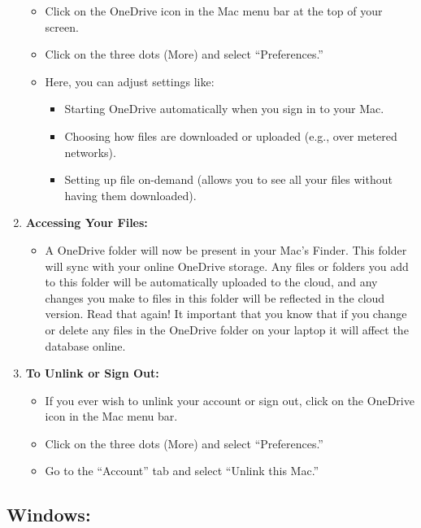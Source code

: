 \documentclass[
]{book}
\providecommand{\tightlist}{%
  \setlength{\itemsep}{0pt}\setlength{\parskip}{0pt}}
\theoremstyle{definition}
\theoremstyle{definition}
\theoremstyle{definition}
\theoremstyle{definition}
\theoremstyle{remark}
\begin{document}
\begin{enumerate}
  \begin{itemize}
  \tightlist
  \item
    Click on the OneDrive icon in the Mac menu bar at the top of your screen.
  \item
    Click on the three dots (More) and select ``Preferences.''
  \item
    Here, you can adjust settings like:

    \begin{itemize}
    \tightlist
    \item
      Starting OneDrive automatically when you sign in to your Mac.
    \item
      Choosing how files are downloaded or uploaded (e.g., over metered networks).
    \item
      Setting up file on-demand (allows you to see all your files without having them downloaded).
    \end{itemize}
  \end{itemize}
\item
  \textbf{Accessing Your Files:}

  \begin{itemize}
  \tightlist
  \item
    A OneDrive folder will now be present in your Mac's Finder. This folder will sync with your online OneDrive storage. { Any files or folders you add to this folder will be automatically uploaded to the cloud, and any changes you make to files in this folder will be reflected in the cloud version.} Read that again! It important that you know that if you change or delete any files in the OneDrive folder on your laptop it will affect the database online.
  \end{itemize}
\item
  \textbf{To Unlink or Sign Out:}

  \begin{itemize}
  \tightlist
  \item
    If you ever wish to unlink your account or sign out, click on the OneDrive icon in the Mac menu bar.
  \item
    Click on the three dots (More) and select ``Preferences.''
  \item
    Go to the ``Account'' tab and select ``Unlink this Mac.''
  \end{itemize}
\end{enumerate}

\hypertarget{windows}{%
\subsection{Windows:}\label{windows}}
\end{document}
